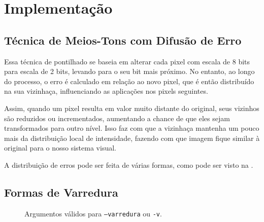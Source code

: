 \section{Implementação} \label{sec:impl}

\subsection{Técnica de Meios-Tons com Difusão de Erro}

    Essa técnica de pontilhado se baseia em alterar cada pixel com escala de 8 bits para escala de 2 bits, levando para o seu bit mais próximo. No entanto, ao longo do processo, o erro é calculado em relação ao novo pixel, que é então distribuído na sua vizinhaça, influenciando as aplicações nos pixels seguintes.

    Assim, quando um pixel resulta em valor muito distante do original, seus vizinhos são reduzidos ou incrementados, aumentando a chance de que eles sejam transformados para outro nível. Isso faz com que a vizinhaça mantenha um pouco mais da distribuição local de intensidade, fazendo com que imagem fique similar à original para o nosso sistema visual.

    A distribuição de erros pode ser feita de várias formas, como pode ser visto na .

\subsection{Formas de Varredura}

    \begin{figure}[H]
        \centering
        

        \caption{Argumentos válidos para \texttt{--varredura} ou \texttt{-v}.}
        \label{fig:varredura}
    \end{figure}

    \begin{figure}
        \centering
        
    \end{figure}

%     



